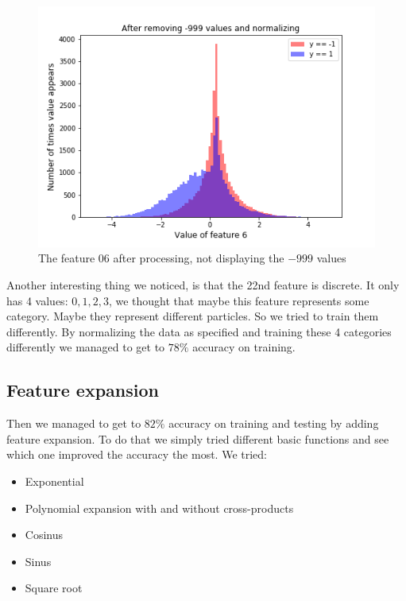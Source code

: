 \documentclass[10pt,conference,compsocconf]{IEEEtran}
\begin{document}
\begin{figure}[h!]
	\centering
  \includegraphics[width=\columnwidth]{graph-features/feature-06-processed.png}
  \caption{The feature 06 after processing, not displaying the $-999$ values}
	\label{fig:feature-06-processed}
\end{figure}

Another interesting thing we noticed, is that the 22nd feature is discrete. It only has 4 values: ${0,1,2,3}$, we thought that maybe this feature represents some category. Maybe they represent different particles. So we tried to train them differently. By normalizing the data as specified and training these 4 categories differently we managed to get to $78\%$ accuracy on training.

\subsection{Feature expansion}
\label{sec:feature-expansion}
Then we managed to get to $82\%$ accuracy on training and testing by adding feature expansion. To do that we simply tried different basic functions and see which one improved the accuracy the most. We tried:

\begin{itemize}
	\item{Exponential}
	\item{Polynomial expansion with and without cross-products}
	\item{Cosinus}
	\item{Sinus}
	\item{Square root}
\end{itemize}
\end{document}
